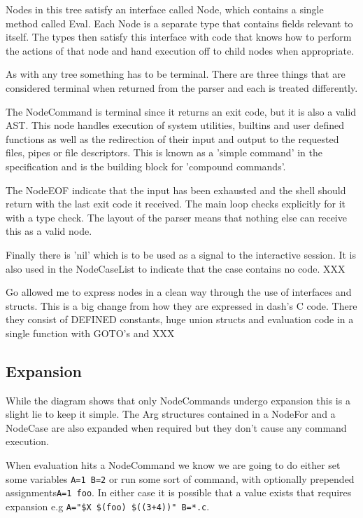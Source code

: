 Nodes in this tree satisfy an interface called Node, which contains a single method called Eval.
Each Node is a separate type that contains fields relevant to itself.
The types then satisfy this interface with code that knows how to perform the actions of that node and hand execution off to child nodes when appropriate.

As with any tree something has to be terminal.
There are three things that are considered terminal when returned from the parser and each is treated differently.

The NodeCommand is terminal since it returns an exit code, but it is also a valid AST.
This node handles execution of system utilities, builtins and user defined functions as well as the redirection of their input and output to the requested files, pipes or file descriptors.
This is known as a 'simple command' in the specification and is the building block for 'compound commands'.

The NodeEOF indicate that the input has been exhausted and the shell should return with the last exit code it received.
The main loop checks explicitly for it with a type check.
The layout of the parser means that nothing else can receive this as a valid node.

Finally there is 'nil' which is to be used as a signal to the interactive session.
It is also used in the NodeCaseList to indicate that the case contains no code.
XXX %

Go allowed me to express nodes in a clean way through the use of interfaces and structs.
This is a big change from how they are expressed in dash's C code.
There they consist of DEFINED constants, huge union structs and evaluation code in a single function with GOTO's and XXX

\subsection{Expansion}
While the diagram shows that only NodeCommands undergo expansion this is a slight lie to keep it simple.
The Arg structures contained in a NodeFor and a NodeCase are also expanded when required but they don't cause any command execution.

When evaluation hits a NodeCommand we know we are going to do either set some variables \verb!A=1 B=2! or run some sort of command, with optionally prepended assignments\verb!A=1 foo!.
In either case it is possible that a value exists that requires expansion e.g \verb!A="$X $(foo) $((3+4))" B=*.c!.

